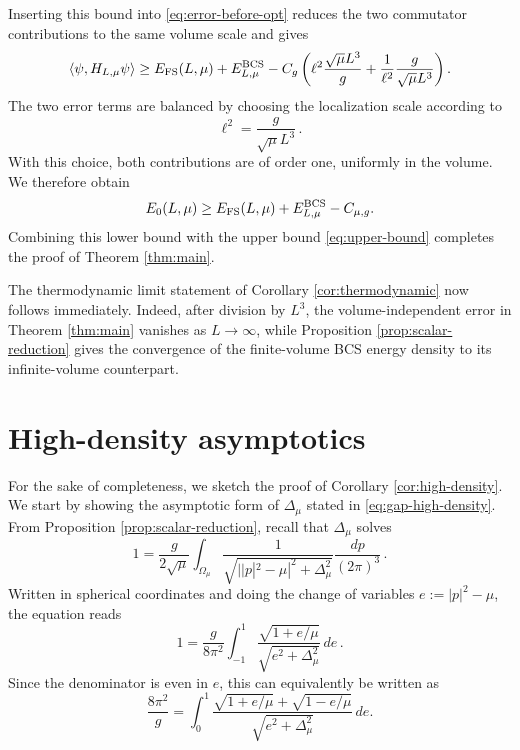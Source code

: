 \documentclass[11pt]{amsart}
\theoremstyle{definition}
\numberwithin{equation}{section}
\newcommand{\1}{\mathbf 1}
\begin{document}
Inserting this bound into \eqref{eq:error-before-opt} reduces the two commutator contributions to the same volume scale and gives
\begin{equation}\label{eq:error-simplified}
 \langle\psi,H_{L,\mu}\psi\rangle
 \ge
 E_{\rm FS}(L,\mu)+E^{\rm BCS}_{L,\mu}
 -C_{g}
 \left( \ell^2
 \frac{\sqrt{\mu}L^3}{g}
 +\frac{1}{\ell^2}\frac{g}{\sqrt{\mu}L^3}
 \right).
\end{equation}
The two error terms are balanced by choosing the localization scale according to
\begin{equation}\label{eq:ell-opt}
 \ell^2=\frac{g}{\sqrt{\mu}L^3}\,.
\end{equation}
With this choice, both contributions are of order one, uniformly in the volume. We therefore obtain
\begin{equation}\label{eq:lower-final}
 E_0(L,\mu)
 \ge
 E_{\rm FS}(L,\mu)+E^{\rm BCS}_{L,\mu}-C_{\mu,g}.
\end{equation}
Combining this lower bound with the upper bound \eqref{eq:upper-bound} completes the proof of Theorem \ref{thm:main}.

The thermodynamic limit statement of Corollary \ref{cor:thermodynamic} now follows immediately. Indeed, after division by $L^3$, the volume-independent error in Theorem \ref{thm:main} vanishes as $L\to\infty$, while Proposition \ref{prop:scalar-reduction} gives the convergence of the finite-volume BCS energy density to its infinite-volume counterpart.




\appendix
\section{High-density asymptotics}
For the sake of completeness, we sketch the proof of Corollary \ref{cor:high-density}. We start by showing the asymptotic form of $\Delta_{\mu}$ stated in \eqref{eq:gap-high-density}. From Proposition \ref{prop:scalar-reduction}, recall that $\Delta_{\mu}$ solves
\begin{equation*}
    1 = \frac{g}{2\sqrt{\mu}}\int_{\Omega_{\mu}}\frac{1}{\sqrt{||p|^2 - \mu |^2 + \Delta_{\mu}^2}}\frac{dp}{(2\pi)^3}\,.
\end{equation*}
Written in spherical coordinates and doing the change of variables $e := |p|^2 - \mu$, the equation reads
\begin{equation*}\label{eq:gap-radial}
 1
 =
 \frac{g}{8\pi^2}
 \int_{-1}^{1}
 \frac{\sqrt{1+e/\mu}}
 {\sqrt{e^2+\Delta_\mu^2}}\,de\,.
\end{equation*}
Since the denominator is even in \(e\), this can equivalently be
written as
\begin{equation*}\label{eq:gap-symmetrized}
 \frac{8\pi^2}{g}
 =
 \int_0^1
 \frac{
 \sqrt{1+e/\mu}+\sqrt{1-e/\mu}}
 {\sqrt{e^2+\Delta_\mu^2}}\,de.
\end{equation*}
\end{document}
